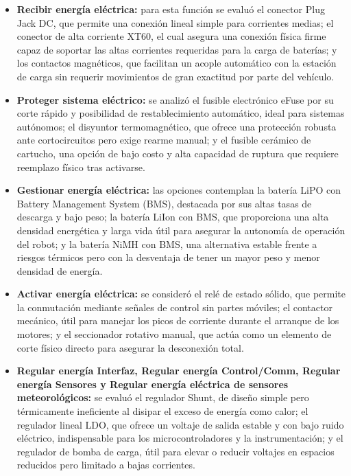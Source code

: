 \begin{itemize}
	\item \textbf{Recibir energía eléctrica:} para esta función se evaluó el conector Plug Jack DC, que permite una conexión lineal simple para corrientes medias; el conector de alta corriente XT60, el cual asegura una conexión física firme capaz de soportar las altas corrientes requeridas para la carga de baterías; y los contactos magnéticos, que facilitan un acople automático con la estación de carga sin requerir movimientos de gran exactitud por parte del vehículo.
	
	\item \textbf{Proteger sistema eléctrico:} se analizó el fusible electrónico eFuse por su corte rápido y posibilidad de restablecimiento automático, ideal para sistemas autónomos; el disyuntor termomagnético, que ofrece una protección robusta ante cortocircuitos pero exige rearme manual; y el fusible cerámico de cartucho, una opción de bajo costo y alta capacidad de ruptura que requiere reemplazo físico tras activarse.
	
	\item \textbf{Gestionar energía eléctrica:} las opciones contemplan la batería LiPO con Battery Management System (BMS), destacada por sus altas tasas de descarga y bajo peso; la batería LiIon con BMS, que proporciona una alta densidad energética y larga vida útil para asegurar la autonomía de operación del robot; y la batería NiMH con BMS, una alternativa estable frente a riesgos térmicos pero con la desventaja de tener un mayor peso y menor densidad de energía.
	
	\item \textbf{Activar energía eléctrica:} se consideró el relé de estado sólido, que permite la conmutación mediante señales de control sin partes móviles; el contactor mecánico, útil para manejar los picos de corriente durante el arranque de los motores; y el seccionador rotativo manual, que actúa como un elemento de corte físico directo para asegurar la desconexión total.
	
	\item \textbf{Regular energía Interfaz, Regular energía Control/Comm, Regular energía Sensores y Regular energía eléctrica de sensores meteorológicos:} se evaluó el regulador Shunt, de diseño simple pero térmicamente ineficiente al disipar el exceso de energía como calor; el regulador lineal LDO, que ofrece un voltaje de salida estable y con bajo ruido eléctrico, indispensable para los microcontroladores y la instrumentación; y el regulador de bomba de carga, útil para elevar o reducir voltajes en espacios reducidos pero limitado a bajas corrientes.
	

\end{itemize}
